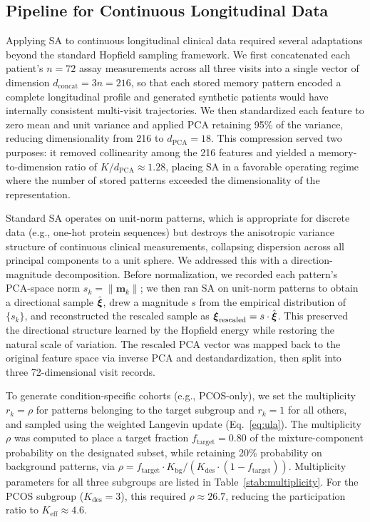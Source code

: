 \subsection{Pipeline for Continuous Longitudinal Data}
\label{sec:pipeline}

Applying SA to continuous longitudinal clinical data required several adaptations
beyond the standard Hopfield sampling framework. We first concatenated each patient's
$n{=}72$ assay measurements across all three visits into a single vector of dimension
$d_{\text{concat}} = 3n = 216$, so that each stored memory pattern encoded a
complete longitudinal profile and generated synthetic patients would have internally
consistent multi-visit trajectories. We then standardized each feature to zero mean
and unit variance and applied PCA retaining 95\% of the variance, reducing
dimensionality from 216 to $d_{\text{PCA}}{=}18$. This compression served two
purposes: it removed collinearity among the 216 features and yielded a
memory-to-dimension ratio of $K/d_{\text{PCA}} \approx 1.28$, placing SA in a
favorable operating regime where the number of stored patterns exceeded the
dimensionality of the representation.

Standard SA operates on unit-norm patterns, which is appropriate for discrete data
(e.g., one-hot protein sequences) but destroys the anisotropic variance structure
of continuous clinical measurements, collapsing dispersion across all principal
components to a unit sphere. We addressed this with a direction-magnitude
decomposition. Before normalization, we recorded each pattern's PCA-space norm
$s_k = \|\mathbf{m}_k\|$; we then ran SA on unit-norm patterns to obtain a
directional sample $\hat{\boldsymbol{\xi}}$, drew a magnitude $s$ from the empirical
distribution of $\{s_k\}$, and reconstructed the rescaled sample as
$\boldsymbol{\xi}_{\text{rescaled}} = s \cdot \hat{\boldsymbol{\xi}}$. This preserved the directional
structure learned by the Hopfield energy while restoring the natural scale of
variation. The rescaled PCA vector was mapped back to the original feature space via
inverse PCA and destandardization, then split into three 72-dimensional visit records.

To generate condition-specific cohorts (e.g., PCOS-only), we set the multiplicity
$r_k = \rho$ for patterns belonging to the target subgroup and $r_k = 1$ for all
others, and sampled using the weighted Langevin update (Eq.~\ref{eq:ula}). The
multiplicity $\rho$ was computed to place a target fraction
$f_{\text{target}} = 0.80$ of the mixture-component probability on the designated subset,
while retaining 20\% probability on background patterns, via
$\rho = f_{\text{target}} \cdot K_{\text{bg}} / (K_{\text{des}} \cdot (1 -
f_{\text{target}}))$. Multiplicity parameters for all three subgroups are
listed in Table~\ref{stab:multiplicity}. For the PCOS subgroup
($K_{\text{des}}{=}3$), this required $\rho \approx 26.7$, reducing the
participation ratio to $K_{\text{eff}} \approx 4.6$. 


